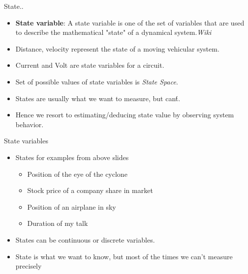 \documentclass{beamer}
\begin{document}
\begin{frame}{State..}

\begin{itemize}
  \item \textbf{State variable}: A state variable is one of the set of variables that are used to describe the mathematical "state" of a dynamical system.\textit{Wiki}
  \item Distance, velocity represent the state of a moving vehicular system.
  \item Current and Volt are state variables for a circuit.
  \item Set of possible values of state variables is \textit{State Space}.
  \item States are usually what we want to measure, but can\'t.
  \item Hence we resort to estimating/deducing state value by observing system behavior.
\end{itemize}
\vskip 1cm
\end{frame}

\begin{frame}{State variables}

\begin{itemize}
  \item States for examples from above slides
  \begin{itemize}
    \item Position of the eye of the cyclone
    \item Stock price of a company share in market
    \item Position of an airplane in sky
    \item Duration of my talk
  \end{itemize}
  \item States can be continuous or discrete variables.
  \item State is what we want to know, but most of the times we can't measure precisely
\end{itemize}
\vskip 1cm
\end{frame}
\end{document}
